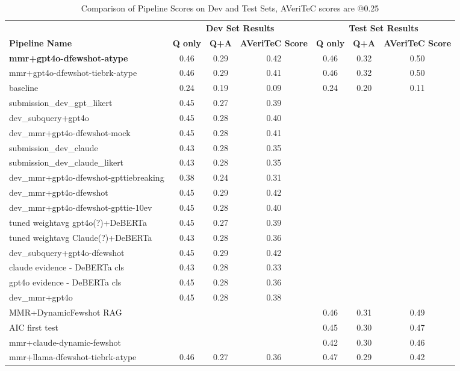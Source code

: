 \begin{table}[h]
    \centering
    \begin{tabular}{l | c c c | c c c}
    \hline
    &\multicolumn{3}{c|}{\textbf{Dev Set Results}} & \multicolumn{3}{c}{\textbf{Test Set Results}}  \\
    \textbf{Pipeline Name} & \textbf{Q only} & \textbf{Q+A} & \textbf{AVeriTeC Score} & \textbf{Q only} & \textbf{Q+A} & \textbf{AVeriTeC Score} \\ \hline
    \textbf{mmr+gpt4o-dfewshot-atype}      & 0.46 & 0.29 & 0.42 & 0.46 & 0.32 & 0.50\\
    mmr+gpt4o-dfewshot-tiebrk-atype & 0.46 & 0.29 & 0.41 & 0.46 & 0.32 & 0.50\\
    \averitec{} baseline            & 0.24 & 0.19 & 0.09 & 0.24 & 0.20 & 0.11\\
    \hline
    submission\_dev\_gpt\_likert       & 0.45 & 0.27 & 0.39 \\
    dev\_subquery+gpt4o                & 0.45 & 0.28 & 0.40 \\
    
    dev\_mmr+gpt4o-dfewshot-mock       & 0.45 & 0.28 & 0.41 \\
    submission\_dev\_claude            & 0.43 & 0.28 & 0.35 \\
    submission\_dev\_claude\_likert   & 0.43 & 0.28 & 0.35 \\
    dev\_mmr+gpt4o-dfewshot-gpttiebreaking & 0.38 & 0.24 & 0.31 \\
    dev\_mmr+gpt4o-dfewshot            & 0.45 & 0.29 & 0.42 \\
    dev\_mmr+gpt4o-dfewshot-gpttie-10ev & 0.45 & 0.28 & 0.40 \\
    tuned weightavg gpt4o(?)+DeBERTa          & 0.45 & 0.27 & 0.39 \\
    tuned weightavg Claude(?)+DeBERTa          & 0.43 & 0.28 & 0.36 \\
    dev\_subquery+gpt4o-dfewshot       & 0.45 & 0.29 & 0.42 \\
    claude evidence - DeBERTa cls               & 0.43 & 0.28 & 0.33 \\
    gpt4o evidence - DeBERTa cls               & 0.45 & 0.28 & 0.36 \\
    dev\_mmr+gpt4o                     & 0.45 & 0.28 & 0.38 \\
    MMR+DynamicFewshot RAG            & & & & 0.46 & 0.31 & 0.49 \\
    AIC first test                     & & & & 0.45 & 0.30 & 0.47 \\
    mmr+claude-dynamic-fewshot          & & & & 0.42 & 0.30 & 0.46 \\
    
    \hline
    mmr+llama-dfewshot-tiebrk-atype & 0.46 & 0.27 & 0.36 & 0.47 & 0.29 & 0.42\\
    \bottomrule
    \end{tabular}
    \caption{Comparison of Pipeline Scores on Dev and Test Sets, AVeriTeC scores are @0.25}
    \label{tab:pipeline_scores}
    \end{table}
    